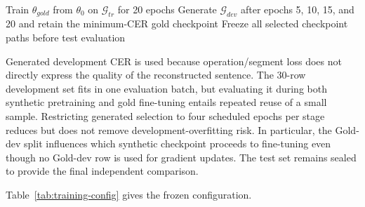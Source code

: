 \documentclass[12pt, a4paper, twoside, openany]{report}
\begin{document}
\begin{algorithm}[H]
	\SetAlgoLined
	Train $\theta_{gold}$ from $\theta_0$ on $\mathcal{G}_{tr}$ for 20 epochs\;
	Generate $\mathcal{G}_{dev}$ after epochs 5, 10, 15, and 20 and retain the minimum-CER gold checkpoint\;
	Freeze all selected checkpoint paths before test evaluation\;
	\caption{Controlled synthetic-pretraining and gold-fine-tuning protocol.}
	\label{alg:benchmark-training}
\end{algorithm}

Generated development CER is used because operation/segment loss does not directly express the quality of the reconstructed sentence. The 30-row development set fits in one evaluation batch, but evaluating it during both synthetic pretraining and gold fine-tuning entails repeated reuse of a small sample. Restricting generated selection to four scheduled epochs per stage reduces but does not remove development-overfitting risk. In particular, the Gold-dev split influences which synthetic checkpoint proceeds to fine-tuning even though no Gold-dev row is used for gradient updates. The test set remains sealed to provide the final independent comparison.

Table~\ref{tab:training-config} gives the frozen configuration.
\end{document}
